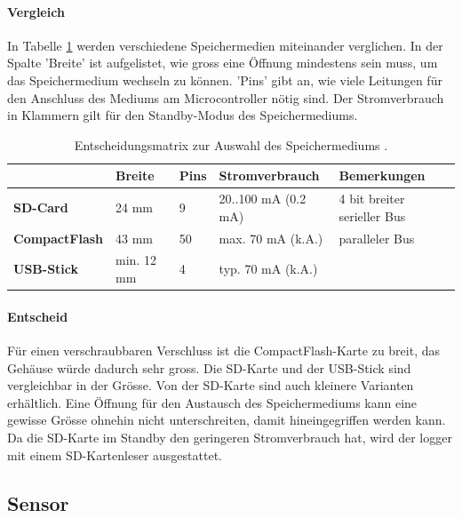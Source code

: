 \paragraph{Vergleich} In Tabelle \ref{table.speichermedium} werden verschiedene Speichermedien miteinander verglichen. In der Spalte 'Breite' ist aufgelistet, wie gross eine Öffnung mindestens sein muss, um das Speichermedium wechseln zu können. 'Pins' gibt an, wie viele Leitungen für den Anschluss des Mediums am Microcontroller nötig sind. Der Stromverbrauch in Klammern gilt für den Standby-Modus des Speichermediums.

\begin{table}
\begin{tabular}{|l|l|l|l|l|}
	\hline
	                      & \textbf{Breite} & \textbf{Pins} & \textbf{Stromverbrauch} & \textbf{Bemerkungen}        \\ \hline
	\textbf{SD-Card}      & 24 mm           & 9             & 20..100 mA (0.2 mA)     & 4 bit breiter serieller Bus \\ \hline
	\textbf{CompactFlash} & 43 mm           & 50            & max. 70 mA (k.A.)       & paralleler Bus              \\ \hline
	\textbf{USB-Stick}    & min. 12 mm      & 4             & typ. 70 mA (k.A.) &  \\ \hline
\end{tabular} 
\caption{Entscheidungsmatrix zur Auswahl des Speichermediums \cite{sdstd,cfstd,usbwiki}.}
\label{table.speichermedium}
\end{table} 

\paragraph{Entscheid} Für einen verschraubbaren Verschluss ist die CompactFlash-Karte zu breit, das Gehäuse würde dadurch sehr gross. Die SD-Karte und der USB-Stick sind vergleichbar in der Grösse. Von der SD-Karte sind auch kleinere Varianten erhältlich. Eine Öffnung für den Austausch des Speichermediums kann eine gewisse Grösse ohnehin nicht unterschreiten, damit hineingegriffen werden kann. Da die SD-Karte im Standby den geringeren Stromverbrauch hat, wird der \gls{logger} mit einem SD-Kartenleser ausgestattet.

\subsection{Sensor}

